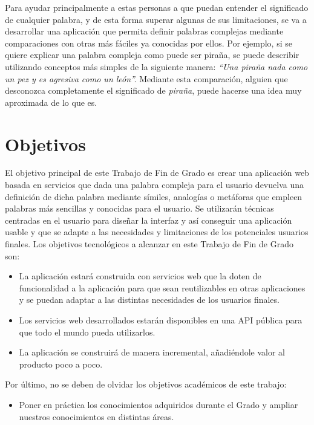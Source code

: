 Para ayudar principalmente a estas personas a que puedan entender el significado de cualquier palabra, y de esta forma superar algunas de sus limitaciones, se va a desarrollar una aplicación que permita definir palabras complejas mediante comparaciones con otras más fáciles ya conocidas por ellos. Por ejemplo, si se quiere explicar una palabra compleja como puede ser piraña, se puede describir utilizando conceptos más simples de la siguiente manera:\textit{ ``Una piraña nada como un pez y es agresiva como un león''.} Mediante esta comparación, alguien que desconozca completamente el significado de \textit{piraña}, puede hacerse una idea muy aproximada de lo que es.


\section{Objetivos}
\label{cap:sec:objetivos}

El objetivo principal de este Trabajo de Fin de Grado es crear una aplicación web basada en servicios que dada una palabra compleja para el usuario devuelva una definición  de dicha palabra mediante símiles, analogías o metáforas que empleen palabras más sencillas y conocidas para el usuario. 
Se utilizarán técnicas centradas en el usuario para diseñar la interfaz y así conseguir una aplicación usable y que se adapte a las necesidades y limitaciones de los potenciales usuarios finales.
Los objetivos tecnológicos a alcanzar en este Trabajo de Fin de Grado son:
\begin{itemize}
	\item La aplicación estará construida con servicios web que la doten de funcionalidad a la aplicación para que sean reutilizables en otras aplicaciones y se puedan adaptar a las distintas necesidades de los usuarios finales.
	\item Los servicios web desarrollados estarán disponibles en una API pública para que todo el mundo pueda utilizarlos.	
	\item La aplicación se construirá de manera incremental, añadiéndole valor al producto poco a poco.	
	
\end{itemize}

Por último, no se deben de olvidar los objetivos académicos de este trabajo:
\begin{itemize}
	\item Poner en práctica los conocimientos adquiridos durante el Grado y ampliar nuestros conocimientos en distintas áreas.

	
\end{itemize}

